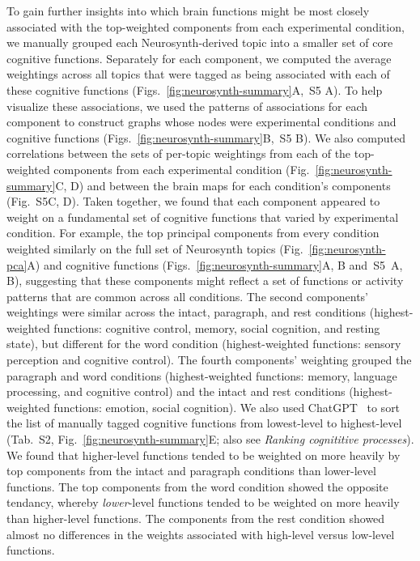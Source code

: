 \documentclass[english, 11pt]{article}
\newcommand{\neurosynthFull}{S5}
\newcommand{\topicTags}{S2}
\begin{document}
To gain further insights into which brain functions might be most closely
associated with the top-weighted components from each experimental condition,
we manually grouped each Neurosynth-derived topic into a smaller set of core
cognitive functions. Separately for each component, we computed the average
weightings across all topics that were tagged as being associated with each of
these cognitive functions (Figs.~\ref{fig:neurosynth-summary}A,~\neurosynthFull
A). To help visualize these associations, we used the patterns of associations
for each component to construct graphs whose nodes were experimental conditions
and cognitive functions (Figs.~\ref{fig:neurosynth-summary}B,~\neurosynthFull
B). We also computed correlations between the sets of per-topic weightings from
each of the top-weighted components from each experimental condition
(Fig.~\ref{fig:neurosynth-summary}C, D) and between the brain maps for each
condition's components (Fig.~\neurosynthFull C, D). Taken together, we found
that each component appeared to weight on a fundamental set of cognitive
functions that varied by experimental condition. For example, the top principal
components from every condition weighted similarly on the full set of
Neurosynth topics (Fig.~\ref{fig:neurosynth-pca}A) and cognitive functions
(Figs.~\ref{fig:neurosynth-summary}A, B and~\neurosynthFull~A, B), suggesting
that these components might reflect a set of functions or activity patterns
that are common across all conditions. The second components' weightings were
similar across the intact, paragraph, and rest conditions (highest-weighted
functions: cognitive control, memory, social cognition, and resting state), but
different for the word condition (highest-weighted functions: sensory
perception and cognitive control). The fourth components' weighting 
grouped the paragraph and word conditions (highest-weighted functions: memory,
language processing, and cognitive control) and the intact and rest conditions
(highest-weighted functions: emotion, social cognition). We also used
ChatGPT~\citep{ChatGPT} to sort the list of manually tagged cognitive functions
from lowest-level to highest-level (Tab.~\topicTags,
Fig.~\ref{fig:neurosynth-summary}E; also see \textit{Ranking cognititive
processes}). We found that higher-level functions tended to be weighted on more
heavily by top components from the intact and paragraph conditions than
lower-level functions. The top components from the word condition showed the
opposite tendancy, whereby \textit{lower}-level functions tended to be weighted
on more heavily than higher-level functions. The components from the rest
condition showed almost no differences in the weights associated with
high-level versus low-level functions.
\end{document}
